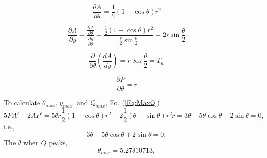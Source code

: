 \begin{equation}
\frac{\partial A}{\partial \theta} = \frac{1}{2} (1 - \cos\theta) r^2
\end{equation}

\begin{equation}
\frac{\partial A}{\partial y} = \frac{\frac{\partial A}{\partial \theta}}{\frac{\partial y}{\partial \theta}} = \frac{\frac{1}{2} (1 - \cos\theta) r^2}{\frac{r}{2}\sin \frac{\theta}{2}} = 2r\sin\frac{\theta}{2}
\end{equation}

\begin{equation}
\frac{\partial}{\partial \theta}\left(\frac{dA}{dy}\right) = r\cos\frac{\theta}{2} = T_w
\end{equation}

\begin{equation}
\frac{\partial P}{\partial \theta} =  r
\end{equation}



%

\noindent To calculate $\theta_{max}$, $y_{max}$, and $Q_{max}$, Eq. (\ref{Eq:MaxQ}) 
\begin{equation}  
5PA' -  2 AP' = 5\theta r \frac{1}{2} (1 - \cos\theta) r^2 - 2 \frac{1}{2} (\theta - \sin\theta) r^2 r =   3\theta - 5\theta \cos \theta + 2 \sin \theta = 0,
\end{equation}
i.e.,
\begin{equation}  
 3\theta - 5\theta \cos \theta + 2 \sin \theta = 0,
\end{equation}
The $\theta$ when $Q$ peaks,
\begin{equation}  
\theta_{max}  = 5.27810713,
\end{equation}

